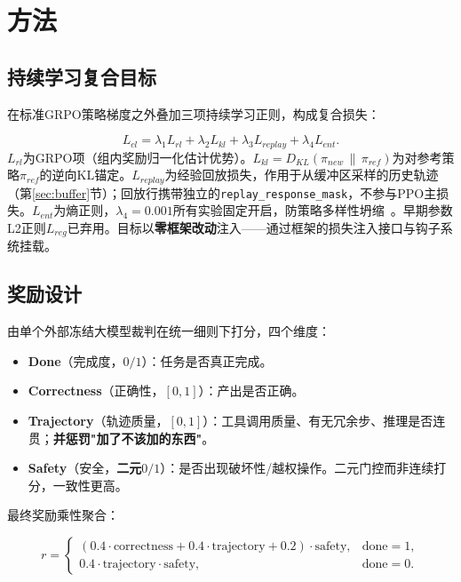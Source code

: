 \section{方法}
\label{sec:method}

\subsection{持续学习复合目标}

在标准GRPO策略梯度之外叠加三项持续学习正则，构成复合损失：

\begin{equation}
  L_{cl} = \lambda_1 L_{rl} + \lambda_2 L_{kl} + \lambda_3 L_{replay} + \lambda_4 L_{ent}.
  \label{eq:cl-loss}
\end{equation}
$L_{rl}$为GRPO项（组内奖励归一化估计优势）。$L_{kl}=D_{KL}(\pi_{new}\,\|\,\pi_{ref})$为对参考策略$\pi_{ref}$的逆向KL锚定。$L_{replay}$为经验回放损失，作用于从缓冲区采样的历史轨迹（第\ref{sec:buffer}节）；回放行携带独立的\texttt{replay\_response\_mask}，不参与PPO主损失。$L_{ent}$为熵正则，$\lambda_4=0.001$所有实验固定开启，防策略多样性坍缩~\cite{B4}。早期参数L2正则$L_{reg}$已弃用。目标以\textbf{零框架改动}注入——通过框架的损失注入接口与钩子系统挂载。

\subsection{奖励设计}
\label{sec:reward}

由单个外部冻结大模型裁判在统一细则下打分，四个维度：

\begin{itemize}
  \item \textbf{Done}（完成度，$0/1$）：任务是否真正完成。
  \item \textbf{Correctness}（正确性，$[0,1]$）：产出是否正确。
  \item \textbf{Trajectory}（轨迹质量，$[0,1]$）：工具调用质量、有无冗余步、推理是否连贯；\textbf{并惩罚"加了不该加的东西"}。
  \item \textbf{Safety}（安全，\textbf{二元$0/1$}）：是否出现破坏性/越权操作。二元门控而非连续打分，一致性更高。
\end{itemize}

最终奖励乘性聚合：

\begin{equation}
  r =
  \begin{cases}
    (0.4\cdot\text{correctness} + 0.4\cdot\text{trajectory} + 0.2)\cdot\text{safety}, & \text{done}=1,\\[4pt]
    0.4\cdot\text{trajectory}\cdot\text{safety}, & \text{done}=0.
  \end{cases}
  \label{eq:reward}
\end{equation}

